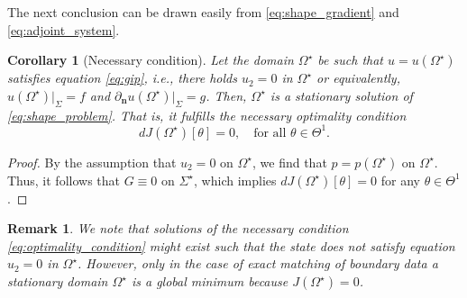 \documentclass[a4paper,11pt]{article}
\newtheorem{remark}{Remark}
\newtheorem{corollary}[theorem]{Corollary}
\newcommand{\vect}[1]{\boldsymbol{\mathbf{#1}}}
\newcommand{\ui}{u_{2}}
\newcommand{\GG}{G} %
\newcommand{\sfTheta}{\Theta}
\newcommand{\VV}{\theta}
\newcommand{\nn}{\vect{n}}
\newcommand{\dn}[1]{\partial_{\nn}{#1}}
\begin{document}
The next conclusion can be drawn easily from \eqref{eq:shape_gradient} and \eqref{eq:adjoint_system}.
%
%
\begin{corollary}[Necessary condition]\label{cor:necessary_condition}
	Let the domain $\varOmega^{\star}$ be such that $u=u(\varOmega^{\star})$ satisfies equation \eqref{eq:gip}, i.e., there holds $\ui = 0$ in $\varOmega^{\star}$ or equivalently, $u(\varOmega^{\star})|_{\varSigma} = f$ and $\dn{}u(\varOmega^{\star})|_{\varSigma} = g$.
	Then, $\varOmega^{\star}$ is a stationary solution of \eqref{eq:shape_problem}.
	That is, it fulfills the necessary optimality condition
	\begin{equation}
	\label{eq:optimality_condition}
		{d}J(\varOmega^{\star})[\VV] = 0, \quad \text{for all $\VV \in \sfTheta^{1}$}.
	\end{equation}
\end{corollary}
\begin{proof}
By the assumption that $\ui = 0$ on $\varOmega^{\star}$, we find that $p = p(\varOmega^{\star})$ on $\varOmega^{\star}$. Thus, it follows that $\GG \equiv 0$ on $\varSigma^{\star}$, which implies ${d}J(\varOmega^{\star})[\VV] = 0$ for any $\VV \in \sfTheta^1$.
\end{proof}
%
\begin{remark}
	We note that solutions of the necessary condition \eqref{eq:optimality_condition} might exist such that the state does not satisfy equation $\ui = 0$ in $\varOmega^{\star}$.
	However, only in the case of exact matching of boundary data a stationary domain $\varOmega^{\star}$ is a global minimum because $J(\varOmega^{\star})=0$.
\end{remark}

\end{document}

